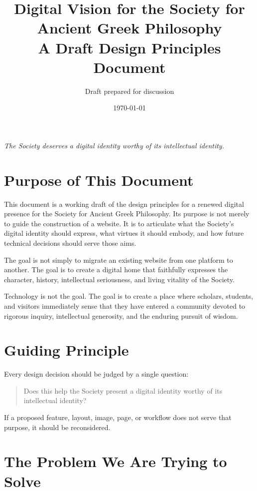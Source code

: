 \documentclass[11pt]{article}
\title{\textbf{Digital Vision for the Society for Ancient Greek Philosophy}\\
\large A Draft Design Principles Document}
\author{Draft prepared for discussion}
\date{\today}
\begin{document}
\maketitle

\begin{center}
\Large\emph{The Society deserves a digital identity worthy of its intellectual identity.}
\end{center}

\vspace{1em}

\section{Purpose of This Document}

This document is a working draft of the design principles for a renewed digital presence for the Society for Ancient Greek Philosophy. Its purpose is not merely to guide the construction of a website. It is to articulate what the Society's digital identity should express, what virtues it should embody, and how future technical decisions should serve those aims.

The goal is not simply to migrate an existing website from one platform to another. The goal is to create a digital home that faithfully expresses the character, history, intellectual seriousness, and living vitality of the Society.

Technology is not the goal. The goal is to create a place where scholars, students, and visitors immediately sense that they have entered a community devoted to rigorous inquiry, intellectual generosity, and the enduring pursuit of wisdom.

\section{Guiding Principle}

Every design decision should be judged by a single question:

\begin{quote}
Does this help the Society present a digital identity worthy of its intellectual identity?
\end{quote}

If a proposed feature, layout, image, page, or workflow does not serve that purpose, it should be reconsidered.

\section{The Problem We Are Trying to Solve}
\end{document}
